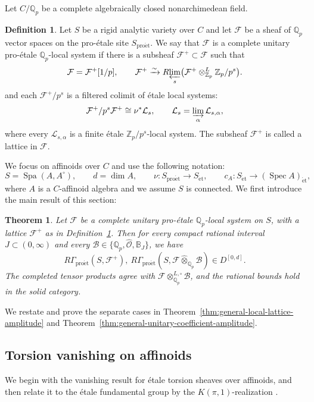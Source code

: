 \documentclass[11pt]{article}
\newtheorem{maintheorem}{Theorem}
\theoremstyle{definition}
\newtheorem{definition}[theorem]{Definition}
\newcommand{\Qp}{\mathbb Q_p}
\newcommand{\Zp}{\mathbb Z_p}
\newcommand{\cF}{\mathcal F}
\newcommand{\proet}{\mathrm{pro\acute et}}
\newcommand{\et}{\mathrm{\acute et}}
\begin{document}
Let \(C/\Qp\) be a complete algebraically closed nonarchimedean
field. 
\begin{definition}
\label{def:complete-unitary-proetale-local-system}
Let $S$ be a rigid analytic variety over $C$ and let $\cF$ be a sheaf of $\mathbb{Q}_p$ vector spaces on the pro-\'etale site $S_{\proet}$.
We say that $\cF$ is a complete unitary pro-\'etale $\mathbb{Q}_p$-local system if there is a subsheaf $\cF^+\subset\cF$ such that
\[
 \mathcal F=\mathcal F^+[1/p],\qquad
 \mathcal F^+\xrightarrow{\sim}
 R\!\varprojlim_s
 \bigl(\mathcal F^+\otimes_{\Zp}^L\Zp/p^s\bigr).
\]and each $\cF^+/p^s$ is a filtered colimit of \'etale local systems: 
\[
 \mathcal F^+/p^s\mathcal F^+\cong\nu^*\mathcal L_s,
 \qquad
 \mathcal L_s=\varinjlim_\alpha\mathcal L_{s,\alpha},
\]where every \(\mathcal L_{s,\alpha}\) is a finite \'etale
\(\Zp/p^s\)-local system.
The subsheaf $\cF^+$ is called a lattice in $\cF$.
\end{definition}
We focus on affinoids over $C$ and use the following notation:
\[
 S=\operatorname{Spa}(A,A^\circ),\qquad d=\dim A,\qquad
 \nu:S_{\proet}\longrightarrow S_{\et},\qquad
 c_A:S_{\et}\longrightarrow(\operatorname{Spec}A)_{\et},
\]
where \(A\) is a \(C\)-affinoid algebra and we assume $S$ is connected. 
We first introduce the main result of this section:
\begin{maintheorem}
\label{thm:general-unitary-coefficient-amplitude-A}
Let \(\mathcal F\) be a complete unitary pro-\'etale \(\Qp\)-local system
on \(S\), with a lattice \(\mathcal F^+\) as in
Definition~\ref{def:complete-unitary-proetale-local-system}.
Then for every compact rational interval \(J\subset(0,\infty)\)
and every \(\mathscr B\in\{\Qp,\widehat{\mathscr O},\mathbb B_J\}\),
we have
\begin{equation*}
 R\Gamma_{\proet}(S,\mathcal F^+),\ 
 R\Gamma_{\proet}(S,\mathcal F\widehat{\otimes}_{\Qp}\mathscr B)
 \in D^{[0,d]}.
\end{equation*}
The completed tensor products agree with
\(\mathcal F\otimes_{\Qp}^{L,\square}\mathscr B\), and the
rational bounds hold in the solid category.
\end{maintheorem}
We restate and prove the separate cases in Theorem~\ref{thm:general-local-lattice-amplitude} and
Theorem~\ref{thm:general-unitary-coefficient-amplitude}. 

\subsection{Torsion vanishing on affinoids}
We begin with the vanishing result for \'etale torsion sheaves over affinoids,
and then relate it to the \'etale fundamental group by the $K(\pi, 1)$-realization \cite[Theorem~4.9]{ScholzeRigid}. 
\end{document}
